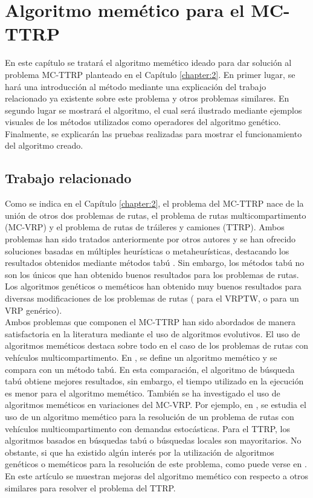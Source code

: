 
\chapter{Algoritmo memético para el MC-TTRP}\label{chapter:3}
En este capítulo se tratará el algoritmo memético ideado para dar solución al problema MC-TTRP planteado en el Capítulo \ref{chapter:2}. En primer lugar, se hará una introducción al método mediante una explicación del trabajo relacionado ya existente sobre este problema y otros problemas similares. En segundo lugar se mostrará el algoritmo, el cual será ilustrado mediante ejemplos visuales de los métodos utilizados como operadores del algoritmo genético. Finalmente, se explicarán las pruebas realizadas para mostrar el funcionamiento del algoritmo creado.

\section{Trabajo relacionado}\label{section:trabajo-rel}
Como se indica en el Capítulo \ref{chapter:2}, el problema del MC-TTRP nace de la unión de otros dos problemas de rutas, el problema de rutas multicompartimento (MC-VRP) y el problema de rutas de tráileres y camiones (TTRP). Ambos problemas han sido tratados anteriormente por otros autores y se han ofrecido soluciones basadas en múltiples heurísticas o metaheurísticas, destacando los resultados obtenidos mediante métodos tabú \cite{chao-ttrp,laura-mcttrp}. Sin embargo, los métodos tabú no son los únicos que han obtenido buenos resultados para los problemas de rutas. Los algoritmos genéticos o meméticos han obtenido muy buenos resultados para diversas modificaciones de los problemas de rutas (\cite{thangiah-1995} para el VRPTW, o \cite{prins-2003} para un VRP genérico).\\

Ambos problemas que componen el MC-TTRP han sido abordados de manera satisfactoria en la literatura mediante el uso de algoritmos evolutivos. El uso de algoritmos meméticos destaca sobre todo en el caso de los problemas de rutas con vehículos multicompartimento. En \cite{MC-VRP-Memetic-ElFallahi}, se define un algoritmo memético y se compara con un método tabú. En esta comparación, el algoritmo de búsqueda tabú obtiene mejores resultados, sin embargo, el tiempo utilizado en la ejecución es menor para el algoritmo memético. También se ha investigado el uso de algoritmos meméticos en variaciones del MC-VRP. Por ejemplo, en \cite{MC-VRP-Stochastic-Mendoza}, se estudia el uso de un algoritmo memético para la resolución de un problema de rutas con vehículos multicompartimento con demandas estocásticas. Para el TTRP, los algoritmos basados en búsquedas tabú o búsquedas locales son mayoritarios. No obstante, si que ha existido algún interés por la utilización de algoritmos genéticos o meméticos para la resolución de este problema, como puede verse en \cite{ttrp-memetic}. En este artículo se muestran mejoras del algoritmo memético con respecto a otros similares para resolver el problema del TTRP.\\

